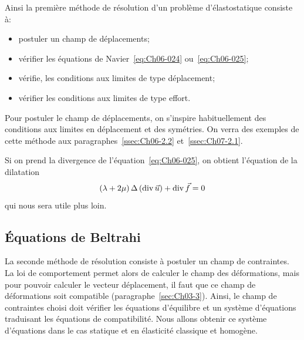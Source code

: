 Ainsi la première méthode de résolution d'un problème d'élastostatique consiste à: 
\begin{itemize}
    \item postuler un champ de déplacements;
    \item vérifier les équations de Navier~\eqref{eq:Ch06-024} ou~\eqref{eq:Ch06-025};
    \item vérifie, les conditions aux limites de type déplacement;
    \item vérifier les conditions aux limites de type effort.
\end{itemize}
Pour postuler le champ de déplacements, on s'inspire habituellement des conditions aux limites en déplacement et des symétries.
On verra des exemples de cette méthode aux paragraphes~\ref{ssec:Ch06-2.2} et~\ref{ssec:Ch07-2.1}. 

Si on prend la divergence de l'équation~\eqref{eq:Ch06-025}, on obtient l'équation de la dilatation
\begin{equation}
    \left( \lambda + 2 \mu \right) \Delta \left( \operatorname*{\mathrm{div}} \vec{u} \right) + \operatorname*{\mathrm{div}} \vec{f} = 0
    \label{eq:Ch06-026}
\end{equation}
qui nous sera utile plus loin.

\subsection{Équations de Beltrahi} \label{ssec:Ch06-1.4}
La seconde méthode de résolution consiste à postuler un champ de contraintes.
La loi de comportement permet alors de calculer le champ des déformations, mais pour pouvoir calculer le vecteur déplacement, il faut que ce champ de déformations soit compatible (paragraphe~\ref{sec:Ch03-3}).
Ainsi, le champ de contraintes choisi doit vérifier les équations d'équilibre et un système d'équations traduisant les équations de compatibilité.
Nous allons obtenir ce système d'équations dans le cas statique et en élasticité classique et homogène.

